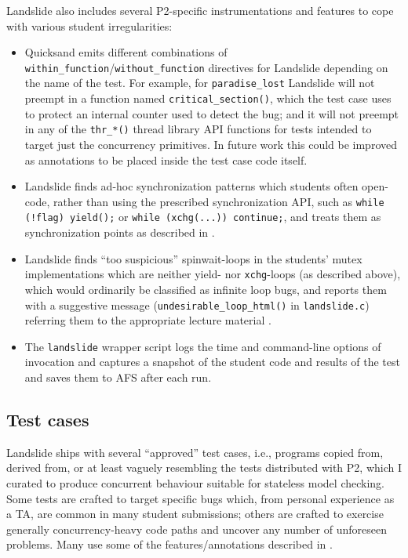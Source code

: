 \noindent Landslide also includes several P2-specific instrumentations and features to cope with various student irregularities:
\begin{itemize}
	\item Quicksand emits different combinations of {\tt within\_function}/{\tt without\_function} directives
		for Landslide depending on the name of the test.
		For example, for {\tt paradise\_lost} Landslide will not preempt in a function named {\tt critical\_section()},
		which the test case uses to protect an internal counter used to detect the bug;
		and it will not preempt in any of the {\tt thr\_*()} thread library API functions
		for tests intended to target just the concurrency primitives.
		In future work this could be improved as annotations to be placed inside the test case code itself.
	\item Landslide finds ad-hoc synchronization patterns which students often open-code,
		rather than using the prescribed synchronization API,
		such as {\tt while (!flag) yield();} or {\tt while (xchg(...)) continue;},
		and treats them as synchronization points as described in \sect{\ref{sec:landslide-blocking}}.
	\item Landslide finds ``too suspicious'' spinwait-loops in the students' mutex implementations
		which are neither yield- nor {\tt xchg}-loops (as described above),
		which would ordinarily be classified as infinite loop bugs,
		and reports them with a suggestive message ({\tt undesirable\_loop\_html()} in {\tt landslide.c})
		referring them to the appropriate lecture material
		\cite{synchronization-2}.
	\item The {\tt landslide} wrapper script logs the time and command-line options of invocation
		and captures a snapshot of the student code and results of the test and saves them to AFS after each run.
\end{itemize}

\subsection{Test cases}
\label{sec:education-pebbles-tests}

Landslide ships with several ``approved'' test cases,
i.e., programs copied from, derived from, or at least vaguely resembling
the tests distributed with P2,
which I curated to produce concurrent behaviour suitable for stateless model checking.
Some tests are crafted to target specific bugs which,
from personal experience as a TA, are common in many student submissions;
others are crafted to exercise generally concurrency-heavy code paths and uncover any number of unforeseen problems.
Many use some of the features/annotations described in \sect{\ref{sec:landslide-testcases}}.

